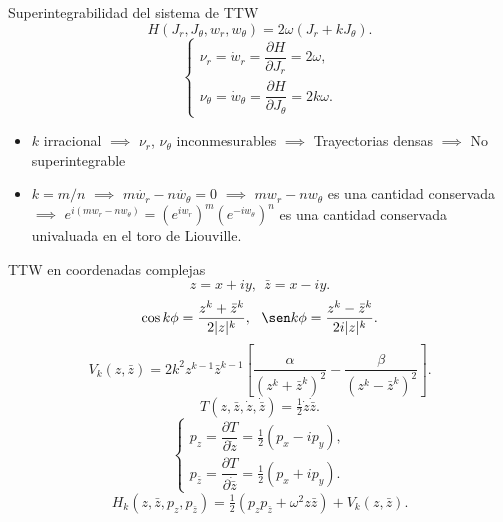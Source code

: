 \documentclass[aspectratio=169,mathserif]{beamer}
\begin{document}
  \begin{frame}{Superintegrabilidad del sistema de TTW}
    \begin{equation*}
      H(J_r,J_\theta,w_r,w_\theta)=2\omega(J_r+kJ_\theta).
    \end{equation*}
    \pause
    \begin{equation*}
      \begin{cases}
	\nu_r=\dot{w}_r=\dfrac{\partial H}{\partial J_r}= 2\omega, \\[7 pt]
	\nu_\theta=\dot{w}_\theta=\dfrac{\partial H}{\partial J_\theta}= 2k\omega.
      \end{cases}
    \end{equation*}
    \pause
    \begin{itemize}
      \item $k$ irracional $\implies$ $\nu_r$, $\nu_\theta$ inconmesurables $\implies$ Trayectorias densas $\implies$ No superintegrable
    \pause
      \item $k=m/n$ $\implies$ $m\dot{w_r}-n\dot{w_\theta}=0$ $\implies$ $mw_r-nw_\theta$ es una cantidad conservada $\implies$
      $e^{i(mw_r - nw_{\theta})}=(e^{iw_r})^m(e^{-iw_\theta})^n$
    es una cantidad conservada univaluada en el toro de Liouville.
    \end{itemize}

  \end{frame}

  \begin{frame}{TTW en coordenadas complejas}
    \begin{equation*}
      z= x+ iy, \ \ \bar{z} = x- iy.
    \end{equation*}
    \pause
    \begin{equation*}
      \cos k\phi = \frac{z^k + \bar{z}^k}{2 |z|^k}, \ \ \sen k\phi = \frac{z^k - \bar{z}^k}{2i |z|^k}.
    \end{equation*}
    \pause
    \begin{equation*}
      V_k(z,\bar{z})=2k^2 z^{k-1}\bar{z}^{k-1}\left[ \frac{\alpha}{(z^k+\bar{z}^k)^2}-\frac{\beta}{(z^k-\bar{z}^k)^2} \right].
    \end{equation*}
    \pause
    \begin{equation*}
      T(z,\bar{z},\dot{z},\dot{\bar{z}})=\tfrac{1}{2}\dot{z}\dot{\bar{z}}.
    \end{equation*}
    \pause
    \begin{equation*}
      \begin{cases}
	p_z=\dfrac{\partial T}{\partial \dot{z}}= \frac{1}{2}(p_x-ip_y),\\[5 pt]
      p_{\bar{z}}=\dfrac{\partial T}{\partial \dot{\bar{z}}}= \frac{1}{2}(p_x+ip_y).
    \end{cases}
    \end{equation*}
    \pause
    \begin{equation*}
      H_k(z,\bar{z},p_z,p_{\bar{z}})=\tfrac{1}{2}(p_zp_{\bar{z}}+\omega^2 z \bar{z})+ V_k(z,\bar{z}).
    \end{equation*}
  \end{frame}
\end{document}

